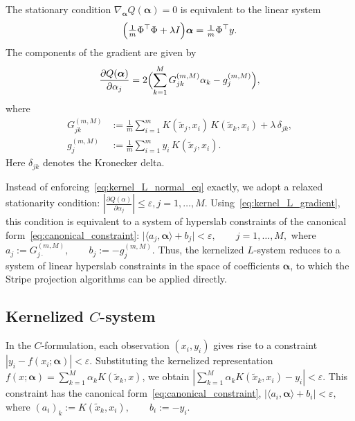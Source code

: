 \documentclass[a4paper,fleqn]{cas-sc}
\begin{document}
The stationary condition $\nabla_{\boldsymbol{\alpha}}Q(\boldsymbol{\alpha})=0$
is equivalent to the linear system
\begin{equation}
\label{eq:kernel_L_normal_eq}
\Bigl(\tfrac{1}{m}\Phi^\top\Phi+\lambda I\Bigr)\boldsymbol{\alpha}
=
\tfrac{1}{m}\Phi^\top y .
\end{equation}
The components of the gradient are given by
\begin{equation}
\label{eq:kernel_L_gradient}
\frac{\partial Q(\boldsymbol{\alpha})}{\partial \alpha_j}
=
2\Bigl(
\sum_{k=1}^{M} G^{(m,M)}_{jk}\alpha_k - g^{(m,M)}_j
\Bigr),
\end{equation}
where
\begin{align}
G^{(m,M)}_{jk}
&:=
\frac{1}{m}\sum_{i=1}^{m}
K(\tilde{x}_j,x_i)\,K(\tilde{x}_k,x_i)
+
\lambda\,\delta_{jk},
\label{eq:kernel_G_def}
\\
g^{(m,M)}_{j}
&:=
\frac{1}{m}\sum_{i=1}^{m}
y_i\,K(\tilde{x}_j,x_i).
\label{eq:kernel_g_def}
\end{align}
Here $\delta_{jk}$ denotes the Kronecker delta.

Instead of enforcing~\eqref{eq:kernel_L_normal_eq} exactly,
we adopt a relaxed stationarity condition:
$
\left|
\frac{\partial Q(\alpha)}{\partial \alpha_j}
\right|
\le \varepsilon,  j=1,\dots,M.
$
Using~\eqref{eq:kernel_L_gradient},
this condition is equivalent to a system of hyperslab constraints
of the canonical form~\eqref{eq:canonical_constraint}:
$
\bigl|
\langle a_j,\boldsymbol{\alpha}\rangle + b_j
\bigr|
<
\varepsilon,
\qquad j=1,\dots,M,
$
where
$
a_j := G^{(m,M)}_{j\cdot},
\qquad
b_j := -g^{(m,M)}_j.
$
Thus, the kernelized $L$-system reduces to a system of linear hyperslab constraints
in the space of coefficients $\boldsymbol{\alpha}$,
to which the Stripe projection algorithms can be applied directly.


\subsection{Kernelized $C$-system}

In the $C$-formulation, each observation $(x_i,y_i)$ gives rise to a constraint
$
|y_i - f(x_i;\boldsymbol{\alpha})| < \varepsilon .
$
Substituting the kernelized representation
$f(x;\boldsymbol{\alpha})=\sum_{k=1}^{M}\alpha_k K(\tilde{x}_k,x)$,
we obtain
$
\left|
\sum_{k=1}^{M}\alpha_k K(\tilde{x}_k,x_i) - y_i
\right| < \varepsilon .
$
This constraint has the canonical form~\eqref{eq:canonical_constraint},
$
|\langle a_i,\boldsymbol{\alpha}\rangle + b_i| < \varepsilon,
$
where
$
(a_i)_k := K(\tilde{x}_k,x_i),
\qquad
b_i := -y_i .
$
\end{document}
